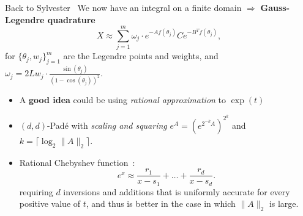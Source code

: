 \documentclass[aspectratio=169,xcolor=dvipsnames]{beamer}
\begin{document}
\begin{frame}{Back to Sylvester~\parencite{MR3867617}}
We now have an integral on a finite domain $\Rightarrow$ \textbf{Gauss-Legendre quadrature}
\[
X\approx\sum_{j=1}^m\omega_j\cdot e^{-Af(\theta_j)}Ce^{-B^Tf(\theta_j)},  
\]
for
$\{ \theta_j, w_j \}_{j=1}^{m}$ are the Legendre points and weights, and $\omega_j=2 L w_j \cdot \frac{\sin(\theta_j)}{ (1 - \cos(\theta_j))^2
}$.
\begin{itemize}
	\item[\faCode]<3-> A \textbf{good idea} could be using \emph{rational approximation} to $\exp(t)$
	\item[\faDoorOpen]<4-> $(d, d)$-Padé with \emph{scaling and squaring} $e^{A} = (e^{2^{-k} A})^{2^k}$ and $k = \lceil \log_2 \|A\|_2 \rceil$.
	\item[\faDoorOpen]<5-> Rational Chebyshev function~\parencite{MR2421464}:
	 \[
	e^{x} \approx \frac{r_1}{x - s_1} + \ldots + \frac{r_d}{x - s_d}. 
	\]
	requiring $d$ inversions and additions that is uniformly accurate for every positive value of $t$, and thus is better in the case in which $\|A\|_2$ is large.
\end{itemize}
\end{frame}
\end{document}
